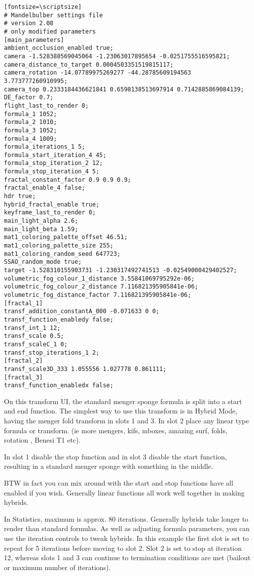 \begin{verbatim}[fontsize=\scriptsize]
# Mandelbulber settings file
# version 2.08
# only modified parameters
[main_parameters]
ambient_occlusion_enabled true;
camera -1.528388569045064 -1.23063017895654 -0.0251755516595821;
camera_distance_to_target 0.0004503351519815117;
camera_rotation -14.07789975269277 -44.28785609194563 3.773777260910995;
camera_top 0.2333184436621841 0.6598138513697914 0.7142885869084139;
DE_factor 0.7;
flight_last_to_render 0;
formula_1 1052;
formula_2 1010;
formula_3 1052;
formula_4 1009;
formula_iterations_1 5;
formula_start_iteration_4 45;
formula_stop_iteration_2 12;
formula_stop_iteration_4 5;
fractal_constant_factor 0.9 0.9 0.9;
fractal_enable_4 false;
hdr true;
hybrid_fractal_enable true;
keyframe_last_to_render 0;
main_light_alpha 2.6;
main_light_beta 1.59;
mat1_coloring_palette_offset 46.51;
mat1_coloring_palette_size 255;
mat1_coloring_random_seed 647723;
SSAO_random_mode true;
target -1.528310155903731 -1.230317492741513 -0.02549000429402527;
volumetric_fog_colour_1_distance 3.55841069795292e-06;
volumetric_fog_colour_2_distance 7.116821395905841e-06;
volumetric_fog_distance_factor 7.116821395905841e-06;
[fractal_1]
transf_addition_constantA_000 -0.071633 0 0;
transf_function_enabledy false;
transf_int_1 12;
transf_scale 0.5;
transf_scaleC_1 0;
transf_stop_iterations_1 2;
[fractal_2]
transf_scale3D_333 1.055556 1.027778 0.861111;
[fractal_3]
transf_function_enabledx false;
\end{verbatim}

On this transform UI, the standard menger sponge formula is split into a start
and end function. The simplest way to use this transform is in Hybrid Mode,
having the menger fold transform in slots 1 and 3. In slot 2 place any linear
type formula or transform. (ie more mengers, kifs, mboxes, amazing surf, folds,
rotation , Benesi T1 etc).

In slot 1 disable the stop function
and in slot 3 disable the start function, resulting in a standard menger sponge
with something in the middle.

BTW in fact you can mix around
with the start and stop functions have all enabled if you wish. Generally linear
functions all work well together in making hybrids.

In
Statistics, maximum is approx. 80 iterations. Generally hybrids take longer to
render than standard formulas.
As well as adjusting formula parameters, you
can use the iteration controls to tweak hybrids. In this example the first slot
is set to repeat for 5 iterations before moving to slot 2. Slot 2 is set to stop
at iteration 12, whereas slots 1 and 3 can continue to termination conditions are
met (bailout or maximum number of iterations).

